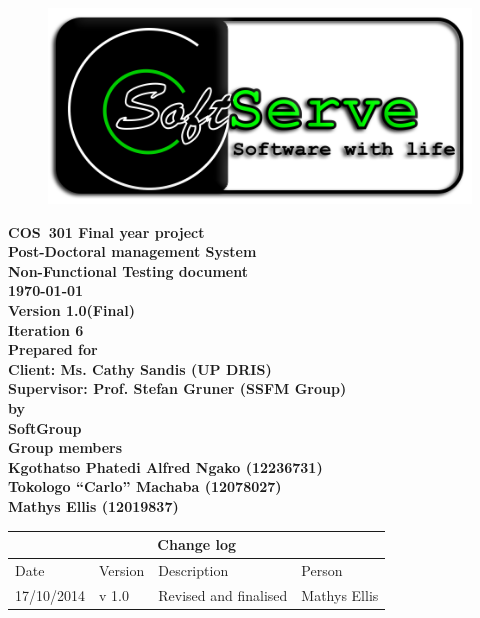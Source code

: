 \documentclass[12pt]{article}
\newcommand{\Title}{Non-Functional Testing document} %
\newcommand{\Class}{COS\ 301 Final year project} %
\newcommand{\ssr}{Soft\color{green}{Serve }\color{black}}
\newcommand{\version}{1.0(Final)}
\newcommand{\iteration}{6}
\newcommand{\client}{Ms. Cathy Sandis (UP DRIS)}
\newcommand{\supervisor}{Prof. Stefan Gruner (SSFM Group)}
\newcommand{\project}{Post-Doctoral management System}
\begin{document}
\vspace{4em}

\begin{center}%

\begin{figure}[ht!]
\centering
\includegraphics{../Images_Docs/logo.png}
\end{figure}
\LARGE \bf \Class \\[0.25em]
\LARGE \bf \project \\[1em]
\LARGE \bf \Title \\[0.25em]
\large \bf \today\\
\bf Version \version\\
\bf Iteration \iteration\\[0.5em]
\Large \bf Prepared for \\Client: \client\\Supervisor: \supervisor
\Large \\\bf by \\
\Large {\bf \ssr Group }\\[0.5em]
\LARGE {\bf Group members}\\[0.25em]
\large
Kgothatso Phatedi Alfred Ngako (12236731) \\[0.5em]
Tokologo “Carlo” Machaba (12078027) \\[0.5em]
Mathys Ellis (12019837) \\[8em]

\end{center}%


\begin{center}
\begin{tabular}{|l|p{1.4cm}|p{8cm}|p{2.8cm}|}
\hline
\multicolumn{4}{|c|}{\bf Change log} \\
\hline
 Date & Version & Description &  Person \\
\hline
17/10/2014 & v 1.0 & Revised and finalised & Mathys Ellis \\
\hline


\end{tabular}
\end{center}
\newpage
\tableofcontents
\end{document}
